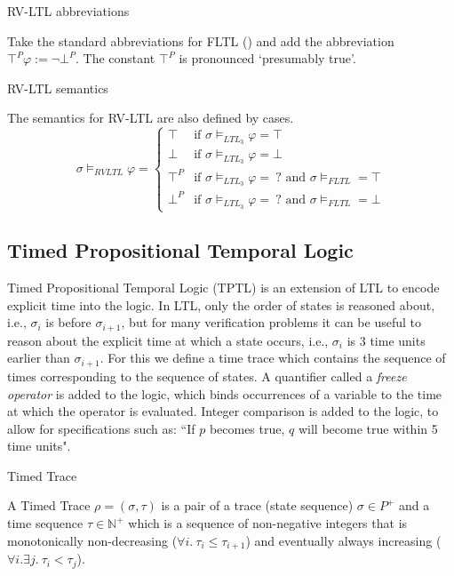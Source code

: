 \documentclass[a4paper]{article}
\newcommand{\tand}{\text{ and }}
\begin{document}
\begin{notn}{RV-LTL abbreviations}

  Take the standard abbreviations for FLTL () and add the abbreviation $\top^P \varphi:= \neg \bot^P$. The constant $\top^P$ is pronounced `presumably true'.
\end{notn}

\begin{defn}{RV-LTL semantics}

  The semantics for RV-LTL are also defined by cases.
  \[\sigma\vDash_{RVLTL}\varphi =
    \begin{cases}
      \top & \text{if } \sigma \vDash_{LTL_3} \varphi = \top\\
      \bot & \text{if } \sigma \vDash_{LTL_3} \varphi = \bot\\
      \top^P & \text{if } \sigma \vDash_{LTL_3} \varphi = ~?\tand \sigma\vDash_{FLTL} = \top \\
      \bot^P & \text{if } \sigma \vDash_{LTL_3} \varphi = ~?\tand \sigma\vDash_{FLTL} = \bot
    \end{cases}
  \]
\end{defn}


\subsection{Timed Propositional Temporal Logic}
Timed Propositional Temporal Logic (TPTL)\autocite{alur1994really} is an extension of LTL to encode explicit time into the logic. In LTL, only the order of states is reasoned about, i.e., $\sigma_i$ is before $\sigma_{i+1}$, but for many verification problems it can be useful to reason about the explicit time at which a state occurs, i.e., $\sigma_i$ is 3 time units earlier than $\sigma_{i+1}$. For this we define a time trace which contains the sequence of times corresponding to the sequence of states. A quantifier called a \emph{freeze operator} is added to the logic, which binds occurrences of a variable to the time at which the operator is evaluated. Integer comparison is added to the logic, to allow for specifications such as: ``If $p$ becomes true, $q$ will become true within 5 time units".



\begin{defn}{Timed Trace}

  A Timed Trace $\rho = (\sigma,\tau)$ is a pair of a trace (state sequence) $\sigma \in P^+$ and a time sequence $\tau \in \mathbb{N}^+$ which is a sequence of non-negative integers that is monotonically non-decreasing ($\forall i. ~\tau_i \leq \tau_{i+1}$) and eventually always increasing ($\forall i. \exists j. ~\tau_i < \tau_j$).
\end{defn}
\end{document}
